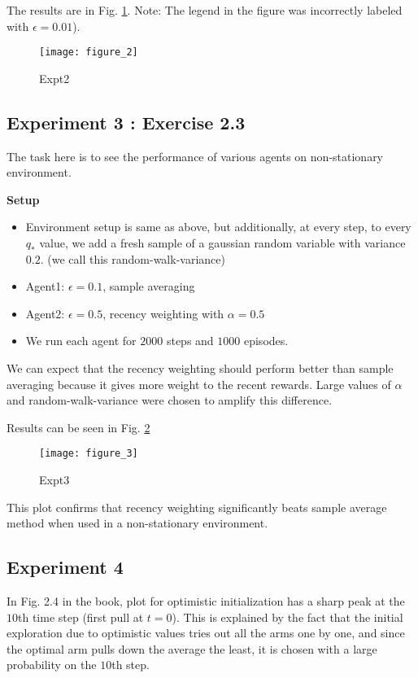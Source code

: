 \documentclass{article}
\begin{document}
The results are in Fig. \ref{expt2}. Note: The legend in the figure was incorrectly labeled with $\epsilon=0.01$).

\begin{figure}
    \texttt{[image: figure\_2]}
    \caption{Expt2}
    \label{expt2}
\end{figure}

\subsection{Experiment 3 : Exercise 2.3}

The task here is to see the performance of various agents on non-stationary environment. 

\textbf{Setup}
\begin{itemize}
    \item Environment setup is same as above, but additionally, at every step, to every $q_*$ value, we add a fresh sample of a gaussian random variable with variance $0.2$. (we call this random-walk-variance)
    \item Agent1: $\epsilon=0.1$, sample averaging
    \item Agent2: $\epsilon=0.5$, recency weighting with $\alpha=0.5$
    \item We run each agent for $2000$ steps and $1000$ episodes.
\end{itemize}

We can expect that the recency weighting should perform better than sample averaging because it gives more weight to the recent rewards. Large values of $\alpha$ and random-walk-variance were chosen to amplify this difference. 

Results can be seen in Fig. \ref{expt3}

\begin{figure}
    \texttt{[image: figure\_3]}
    \caption{Expt3}
    \label{expt3}
\end{figure}

This plot confirms that recency weighting significantly beats sample average method when used in a non-stationary environment.

\subsection{Experiment 4}

In Fig. 2.4 in the book, plot for optimistic initialization has a sharp peak at the $10$th time step (first pull at $t=0$). This is explained by the fact that the initial exploration due to optimistic values tries out all the arms one by one, and since the optimal arm pulls down the average the least, it is chosen with a large probability on the $10$th step. 
\end{document}
